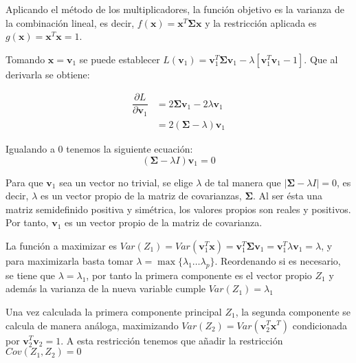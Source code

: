 \noindent Aplicando el método de los multiplicadores, la función objetivo es la varianza de la combinación lineal, es decir, $f(\mathbf{x})=\mathbf{x}^T \mathbf{\Sigma} \mathbf{x}$ y la restricción aplicada es $g(\textbf{x})=\textbf{x}^T\textbf{x}=1$. 

\noindent Tomando $\textbf{x}=\textbf{v}_1$ se puede establecer $L(\textbf{v}_1)=\textbf{v}_1^T \mathbf{\Sigma} \textbf{v}_1 - \lambda[\textbf{v}_1^T \textbf{v}_1-1]$. Que al derivarla se obtiene:

\begin{align*}
\dfrac{\partial L}{\partial \textbf{v}_1} &= 2\mathbf{\Sigma} \textbf{v}_1 - 2\lambda\textbf{v}_1\\
& = 2(\mathbf{\Sigma}-\lambda)\textbf{v}_1 
\end{align*}

\noindent Igualando a 0 tenemos la siguiente ecuación: 
\begin{equation}
(\mathbf{\Sigma}-\lambda I)\textbf{v}_1=0
\end{equation}

\noindent Para que $\textbf{v}_1$ sea un vector no trivial, se elige $\lambda$ de tal manera que $|\mathbf{\Sigma}-\lambda I| = 0$, es decir, $\lambda$ es un vector propio de la matriz de covarianzas, $\mathbf{\Sigma}$. Al ser ésta una matriz semidefinido positiva y simétrica, los valores propios son reales y positivos. Por tanto, $\textbf{v}_1$ es un vector propio de la matriz de covarianza.

\noindent La función a maximizar es $Var(Z_1)=Var(\textbf{v}_1^T\textbf{x})=\textbf{v}_1^T\mathbf{\Sigma} \textbf{v}_1=\textbf{v}_1^T\lambda \textbf{v}_1=\lambda$, y para maximizarla basta tomar $\lambda=\max{\lbrace\lambda_1\ldots \lambda_p\rbrace}$. Reordenando si es necesario, se tiene que $\lambda=\lambda_1$, por tanto la primera componente es el vector propio $Z_1$ y además la varianza de la nueva variable cumple $Var(Z_1)=\lambda_1$ 

\noindent Una vez calculada la primera componente principal $Z_1$, la segunda componente se calcula de manera análoga, maximizando $Var(Z_2)=Var(\textbf{v}_2^T\textbf{x}^T)$ condicionada por $\textbf{v}_2^T\textbf{v}_2=1$. A esta restricción tenemos que añadir la restricción $Cov(Z_1,Z_2)=0 $

